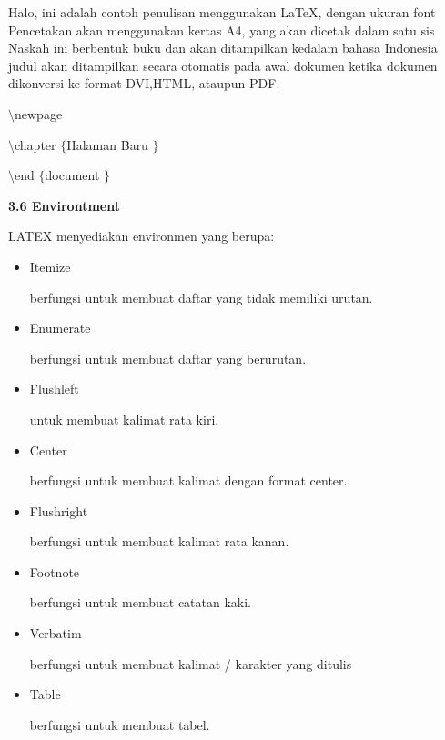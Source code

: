 \begin{itemize}
\vspace{10pt}
{\fontsize{10pt}{10pt}\selectfont Halo, ini adalah contoh penulisan menggunakan LaTeX, dengan ukuran font Pencetakan akan menggunakan kertas A4, yang akan dicetak dalam satu sis Naskah ini berbentuk buku dan akan ditampilkan kedalam bahasa Indonesia judul akan ditampilkan secara otomatis pada awal dokumen ketika dokumen dikonversi ke format DVI,HTML, ataupun PDF.} \par
\vspace{10pt}
{\fontsize{10pt}{10pt}\selectfont  $  \setminus  $newpage} \par
{\fontsize{10pt}{10pt}\selectfont  $  \setminus  $chapter $  \{  $Halaman Baru $  \}  $} \par
{\fontsize{10pt}{10pt}\selectfont  $  \setminus  $end $  \{  $document $  \}  $} \par
\vspace{12pt}
\textbf{3.6 Environtment} \par
LATEX menyediakan environmen yang berupa:
\par
\begin{itemize}
\item Itemize \par
berfungsi untuk membuat daftar yang tidak memiliki urutan. \par
\item Enumerate \par
berfungsi untuk membuat daftar yang berurutan. \par
\item Flushleft \par
untuk membuat kalimat rata kiri. \par
\item Center \par
berfungsi untuk membuat kalimat dengan format center. \par
\item Flushright \par
berfungsi untuk membuat kalimat rata kanan. \par
\item Footnote \par
berfungsi untuk membuat catatan kaki. \par
\item Verbatim \par
berfungsi untuk membuat kalimat / karakter yang ditulis \par
\item Table \par
berfungsi untuk membuat tabel. \end{itemize} \par

\end{itemize}
